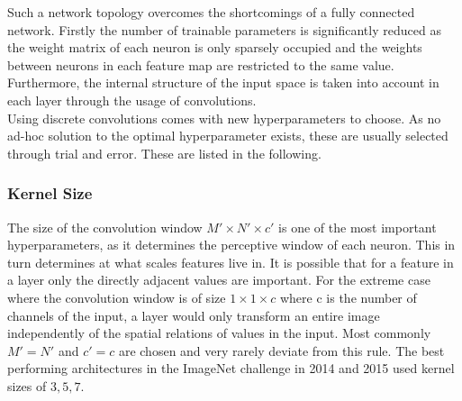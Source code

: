 Such a network topology overcomes the shortcomings of a fully connected network. Firstly the number of trainable parameters is significantly reduced as the weight matrix of each neuron is only sparsely occupied and the weights between neurons in each feature map are restricted to the same value. Furthermore, the internal structure of the input space is taken into account in each layer through the usage of convolutions. \\

Using discrete convolutions comes with new hyperparameters to choose. As no ad-hoc solution to the optimal hyperparameter exists, these are usually selected through trial and error. These are listed in the following.

\subsubsection{Kernel Size}
The size of the convolution window $M' \times N' \times c'$ is one of the most important hyperparameters, as it determines the perceptive window of each neuron. This in turn determines at what scales features live in. It is possible that for a feature in a layer only the directly adjacent values are important. For the extreme case where the convolution window is of size $1\times 1 \times c$ where c is the number of channels of the input, a layer would only transform an entire image independently of the spatial relations of values in the input. Most commonly $M'=N'$ and $c'=c$ are chosen and very rarely deviate from this rule. The best performing architectures in the ImageNet challenge \cite{imagenet_cvpr09} in 2014 \cite{Szegedy2015} and 2015 \cite{He2015} used kernel sizes of $3,5,7$.



